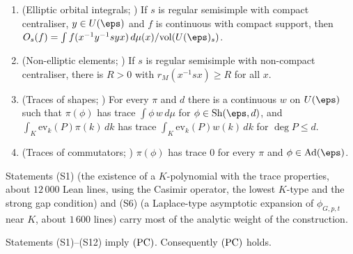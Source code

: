 \begin{enumerate}[label=(S\arabic*)]
$\mathrm{Ad}(\eps)$ have orbital integral $0$ at every regular semisimple element.
\item (Elliptic orbital integrals; ) If $s$ is regular semisimple with compact
centraliser, $y\in U(\eps)$ and $f$ is continuous with compact support, then
$O_s(f)=\int f(x^{-1}y^{-1}syx)\,d\mu(x)/\mathrm{vol}(U(\eps)_s)$.
\item (Non-elliptic elements; ) If $s$ is regular semisimple with non-compact
centraliser, there is $R>0$ with $r_M(x^{-1}sx)\ge R$ for all $x$.
\item (Traces of shapes; ) For every $\pi$ and $d$ there is a continuous $w$ on
$U(\eps)$ such that $\pi(\phi)$ has trace $\int\phi\,w\,d\mu$ for $\phi\in\mathrm{Sh}(\eps,d)$, and
$\int_K\mathrm{ev}_k(P)\pi(k)\,dk$ has trace $\int_K\mathrm{ev}_k(P)w(k)\,dk$ for $\deg P\le d$.
\item (Traces of commutators; ) $\pi(\phi)$ has trace $0$ for every $\pi$ and
$\phi\in\mathrm{Ad}(\eps)$.
\end{enumerate}

Statements (S1) (the existence of a $K$-polynomial with the trace properties, about $12\,000$ Lean lines, using the Casimir
operator, the lowest $K$-type and the strong gap condition) and (S6) (a Laplace-type asymptotic expansion of
$\phi_{G,p,t}$ near $K$, about $1\,600$ lines) carry most of the analytic weight of the construction.

\begin{theorem}\label{pf:multnc:localpc}
Statements (S1)--(S12) imply $\textup{(PC)}$. Consequently $\textup{(PC)}$ holds.
\end{theorem}

